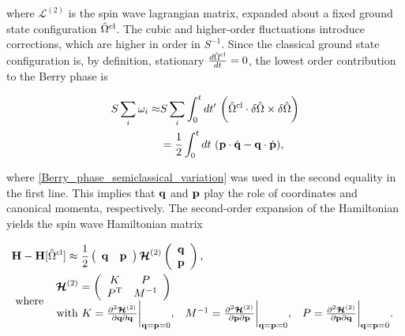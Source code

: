 \documentclass{homework}
\begin{document}
where $ \bm{\mathcal{L}}^{(2)}$ is the spin wave lagrangian matrix, expanded about a fixed ground state configuration $\hat{\Omega}^{\textnormal{cl}}$. The cubic and higher-order fluctuations introduce corrections, which are higher in order in $S^{-1}$. Since the classical ground state configuration is, by definition, stationary $\frac{d \hat{\Omega}^{\textnormal{cl}}}{dt} = 0$, the lowest order contribution to the Berry phase is 

\begin{equation}
\begin{split}
    S \sum_{i}\omega_i \approx& S \sum_{i} \int_{0}^{t} dt' \textnormal{ } \bigg(\hat{\Omega}^{\textnormal{cl}} \cdot \delta\hat{\Omega} \times \delta \hat{\Omega} \bigg) \\
    &= \frac{1}{2} \int_{0}^{t} dt \textnormal{ } ({\bf p} \cdot \dot{{\bf q}} - {\bf q} \cdot \dot{{\bf p}}),
\end{split}
\end{equation}

where \cref{Berry_phase_semiclassical_variation} was used in the second equality in the first line. This implies that ${\bf q}$ and ${\bf p}$ play the role of coordinates and canonical momenta, respectively. The second-order expansion of the Hamiltonian yields the spin wave Hamiltonian matrix 

\begin{equation}
    \begin{split}
        &{\bf H} - {\bf H}[\hat{\Omega}^{\textnormal{cl}}] \approx \frac{1}{2} \left(\begin{array}{cc}
          {\bf q} & {\bf p}
    \end{array}\right) \bm{\mathcal{H}}^{(2)} \left( \begin{array}{c}
          {\bf q} \\
          {\bf p}
    \end{array}\right), \\
    &\textnormal{ where } \begin{array}{ccc}
         \bm{\mathcal{H}}^{(2)} = \left(\begin{array}{cc}
         K & P  \\
         P^{\textnormal{T}} & M^{-1} 
    \end{array}\right) \\
         \textnormal{ with } K = \frac{\partial^2 \bm{\mathcal{H}}^{(2)}}{\partial {\bf q} \partial {\bf q}}\bigg|_{{\bf q} = {\bf p} = 0}, & 
         M^{-1} = \frac{\partial^2 \bm{\mathcal{H}}^{(2)}}{\partial {\bf p} \partial {\bf p}}\bigg|_{{\bf q} = {\bf p} = 0}, & 
         P = \frac{\partial^2 \bm{\mathcal{H}}^{(2)}}{\partial {\bf p} \partial {\bf q}}\bigg|_{{\bf q} = {\bf p} = 0}.
    \end{array}
    \end{split}
\end{equation}
\end{document}
